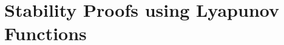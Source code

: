 \documentclass[preprint,nocopyrightspace]{sigplanconf}
\begin{document}














\section{Stability Proofs using Lyapunov Functions}
\label{sec:lyapunov-functions}
\end{document}
